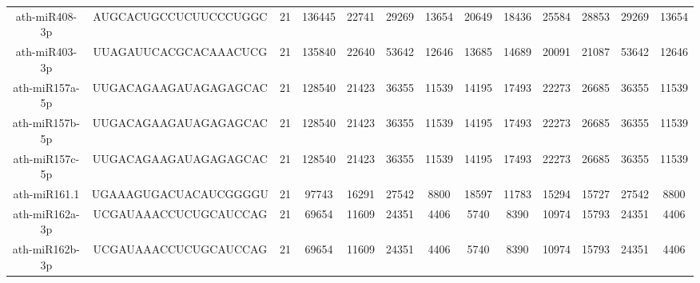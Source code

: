 \begin{landscape}
\begin{table}[]
\begin{tabular}{ccccccccccccc}
    ath-miR408-3p    & AUGCACUGCCUCUUCCCUGGC    & 21           & 136445       & 22741            & 29269        & 13654                        & 20649                & 18436                & 25584                 & 28853                 & 29269                 & 13654                 \\
    ath-miR403-3p    & UUAGAUUCACGCACAAACUCG    & 21           & 135840       & 22640            & 53642        & 12646                        & 13685                & 14689                & 20091                 & 21087                 & 53642                 & 12646                 \\
    ath-miR157a-5p   & UUGACAGAAGAUAGAGAGCAC    & 21           & 128540       & 21423            & 36355        & 11539                        & 14195                & 17493                & 22273                 & 26685                 & 36355                 & 11539                 \\
    ath-miR157b-5p   & UUGACAGAAGAUAGAGAGCAC    & 21           & 128540       & 21423            & 36355        & 11539                        & 14195                & 17493                & 22273                 & 26685                 & 36355                 & 11539                 \\
    ath-miR157c-5p   & UUGACAGAAGAUAGAGAGCAC    & 21           & 128540       & 21423            & 36355        & 11539                        & 14195                & 17493                & 22273                 & 26685                 & 36355                 & 11539                 \\
    ath-miR161.1     & UGAAAGUGACUACAUCGGGGU    & 21           & 97743        & 16291            & 27542        & 8800                         & 18597                & 11783                & 15294                 & 15727                 & 27542                 & 8800                  \\
    ath-miR162a-3p   & UCGAUAAACCUCUGCAUCCAG    & 21           & 69654        & 11609            & 24351        & 4406                         & 5740                 & 8390                 & 10974                 & 15793                 & 24351                 & 4406                  \\
    ath-miR162b-3p   & UCGAUAAACCUCUGCAUCCAG    & 21           & 69654        & 11609            & 24351        & 4406                         & 5740                 & 8390                 & 10974                 & 15793                 & 24351                 & 4406                  \\

\end{tabular}
\end{table}
\end{landscape}

